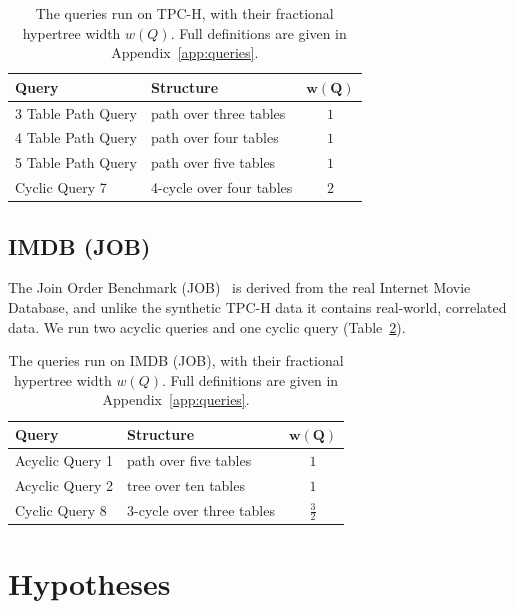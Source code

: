 \begin{table}[H]
  \centering
  \begin{tabular}{@{}llc@{}}
    \toprule
    \textbf{Query} & \textbf{Structure} & $\boldsymbol{w(Q)}$ \\
    \midrule
    3 Table Path Query & path over three tables & $1$ \\
    4 Table Path Query & path over four tables  & $1$ \\
    5 Table Path Query & path over five tables  & $1$ \\
    Cyclic Query 7     & 4-cycle over four tables & $2$ \\
    \bottomrule
  \end{tabular}
  \caption{The queries run on TPC-H, with their fractional hypertree width $w(Q)$. Full definitions are given in Appendix~\ref{app:queries}.}
  \label{tab:queries_tpch}
\end{table}

\subsection{IMDB (JOB)}
The Join Order Benchmark (JOB)~\cite{leis2015} is derived from the real Internet Movie Database, and unlike the synthetic TPC-H data it contains real-world, correlated data. We run two acyclic queries and one cyclic query (Table~\ref{tab:queries_imdb}).

\begin{table}[H]
  \centering
  \begin{tabular}{@{}llc@{}}
    \toprule
    \textbf{Query} & \textbf{Structure} & $\boldsymbol{w(Q)}$ \\
    \midrule
    Acyclic Query 1 & path over five tables      & $1$ \\
    Acyclic Query 2 & tree over ten tables       & $1$ \\
    Cyclic Query 8  & 3-cycle over three tables & $\tfrac{3}{2}$ \\
    \bottomrule
  \end{tabular}
  \caption{The queries run on IMDB (JOB), with their fractional hypertree width $w(Q)$. Full definitions are given in Appendix~\ref{app:queries}.}
  \label{tab:queries_imdb}
\end{table}

\section{Hypotheses}
\label{sec:hypotheses}

